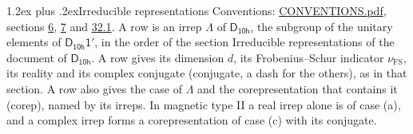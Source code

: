 \documentclass[10pt,a4paper]{article}
\makeatletter
\renewcommand\section{\@startsection{section}{1}{\z@}{-3ex plus -1ex minus -.2ex}%
  {1.2ex plus .2ex}{\normalfont\large\sffamily\bfseries\color{parttitle}}}
\numberwithin{equation}{section}
\newcommand{\grp}[1]{\mathsf{#1}}
\newcommand{\fsind}{\nu_{\mathrm{FS}}}
\makeatother
\begin{document}
\section{Irreducible representations}\label{s:irreps}
Conventions: \href{../../CONVENTIONS.pdf}{CONVENTIONS.pdf}, sections \href{../../../rotation/CONVENTIONS.pdf\#conv.6}{6}, \href{../../../rotation/CONVENTIONS.pdf\#conv.7}{7} and \href{../../CONVENTIONS.pdf\#conv.32.1}{32.1}.
\leavevmode\label{n:irrep.Delta}A row is an irrep $\Lambda$ of $\grp{D_{10h}}$, the subgroup of the unitary elements of $\grp{D_{10h}1'}$, in the order of the section Irreducible representations of the document of \href{../../../rotation/data/pdf/D10h.pdf}{$\grp{D_{10h}}$}. \label{n:index.dimension}\label{n:index.frobenius}\label{n:head.irrep}\label{n:head.reality}\label{n:head.conjugate}A row gives its dimension $d$, its Frobenius--Schur indicator $\fsind$, its reality and its complex conjugate (conjugate, a dash for the others), as in that section. \label{n:head.case.corep}\label{n:head.corep}A row also gives the case of $\Lambda$ and the corepresentation that contains it (corep), named by its irreps. In magnetic type II a real irrep alone is of case (a), and a complex irrep forms a corepresentation of case (c) with its conjugate.
\setlength{\emergencystretch}{2em}\par\setlength{\emergencystretch}{0pt}
\end{document}
